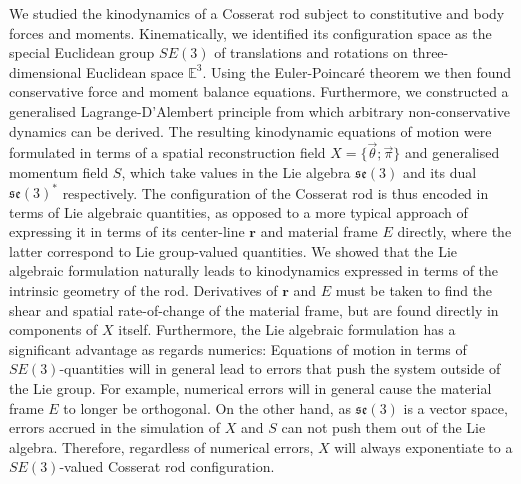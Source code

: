 We studied the kinodynamics of a Cosserat rod subject to constitutive and body forces and moments. Kinematically, we identified its configuration space as the special Euclidean group $SE(3)$ of translations and rotations on three-dimensional Euclidean space $\mathbb{E}^3$. Using the Euler-Poincaré theorem we then found conservative force and moment balance equations. Furthermore, we constructed a generalised Lagrange-D'Alembert principle from which arbitrary non-conservative dynamics can be derived. The resulting kinodynamic equations of motion were formulated in terms of a spatial reconstruction field $X = \{ \vec{\theta} ; \vec{\pi} \}$ and generalised momentum field $S$, which take values in the Lie algebra $\mathfrak{se}(3)$ and its dual $\mathfrak{se}(3)^*$ respectively. The configuration of the Cosserat rod is thus encoded in terms of Lie algebraic quantities, as opposed to a more typical approach of expressing it in terms of its center-line $\mathbf{r}$ and material frame $E$ directly, where the latter correspond to Lie group-valued quantities. We showed that the Lie algebraic formulation naturally leads to kinodynamics expressed in terms of the intrinsic geometry of the rod. Derivatives of $\mathbf{r}$ and $E$ must be taken to find the shear and spatial rate-of-change of the material frame, but are found directly in components of $X$ itself. Furthermore, the Lie algebraic formulation has a significant advantage as regards  numerics: Equations of motion in terms of $SE(3)$-quantities will in general lead to errors that push the system outside of the Lie group. For example, numerical errors will in general cause the material frame $E$ to longer be orthogonal. On the other hand, as $\mathfrak{se}(3)$ is a vector space, errors accrued in the simulation of $X$ and $S$ can not push them out of the Lie algebra. Therefore, regardless of numerical errors, $X$ will always exponentiate to a $SE(3)$-valued Cosserat rod configuration.

